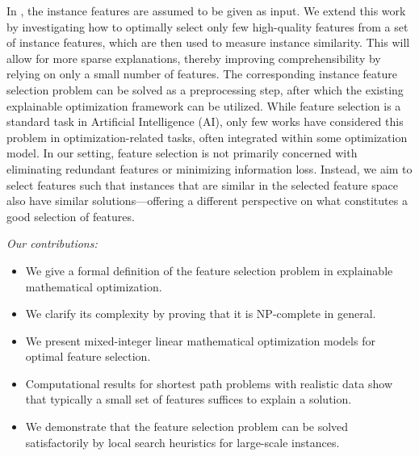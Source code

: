 \documentclass[11pt, a4paper]{article}
\newcommand{\FLil}[1]{\todo[color=yellow, textcolor=blue, inline, author=FL]{#1}}
\begin{document}

In \cite{aigner2024framework}, the instance features are assumed to be given as input. We extend this work by investigating how to optimally select only few high-quality features from a set of instance features, which are then used
 to measure instance similarity. This will allow for more sparse explanations, thereby improving comprehensibility by relying on only a small number of features.
The corresponding instance feature selection problem can be solved as a preprocessing step, after which the existing explainable optimization framework can be utilized.
While feature selection is a standard task in Artificial Intelligence (AI), only few works have considered this problem in optimization-related tasks, often integrated within some optimization model. In our setting, feature selection is not primarily concerned with eliminating redundant features or minimizing information loss. Instead, we aim to select features such that instances that are similar in the selected feature space also have similar solutions---offering a different perspective on what constitutes a good selection of features.



\emph{Our contributions:}
\begin{itemize}
\item We give a formal definition of the feature selection problem in explainable mathematical optimization.

\item We clarify its complexity by proving that it is NP-complete in general.

\item We present mixed-integer linear mathematical optimization models for optimal feature selection.%

\item Computational results for shortest path problems with realistic data show that typically a small set of features suffices to explain a solution.

\item We demonstrate that the feature selection problem can be solved satisfactorily by local search heuristics for large-scale instances.

\end{itemize}
\end{document}
